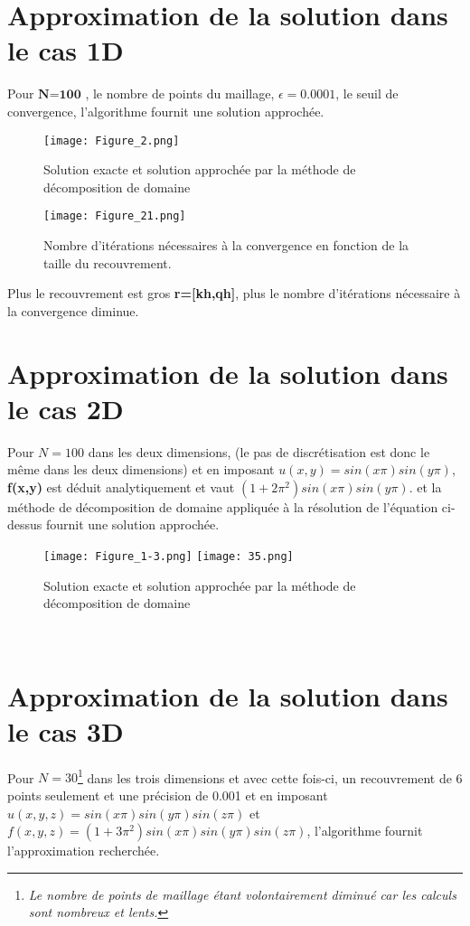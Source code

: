 \documentclass[a4paper,12pt,twoside]{report}
\begin{document}
\section{Approximation de la solution dans le cas 1D}

Pour $\textbf{N=100}$ , le nombre de points du maillage,  \textbf{$\epsilon=0.0001$}, le seuil de convergence, l'algorithme fournit une solution approchée.
\begin{figure}[htpb!]
\centering
  \texttt{[image: Figure\_2.png]}
  \caption{Solution exacte et solution approchée par la méthode de décomposition de domaine}
  \label{fig:exemple}
\end{figure}


\begin{figure}[htpb!]
\centering
  \texttt{[image: Figure\_21.png]}  \caption{Nombre d'itérations nécessaires à la convergence en fonction de la taille du recouvrement.}
  \label{fig:exemple}
\end{figure}
Plus le recouvrement est gros \textbf{r=[kh,qh]}, plus le nombre d'itérations nécessaire à la convergence diminue.





\section{Approximation de la solution dans le cas 2D}
Pour \textbf{$N=100$} dans les deux dimensions, (le pas de discrétisation est donc le même dans les deux dimensions) et en imposant $u(x,y)=sin(x\pi)sin(y\pi)$, \textbf{f(x,y)} est déduit analytiquement et vaut $(1+2\pi^{2}
)sin(x\pi)sin(y\pi)$.
et la méthode de décomposition de domaine appliquée à la résolution de l'équation ci-dessus fournit une solution approchée.
\begin{figure}[htpb!]
  \texttt{[image: Figure\_1-3.png]} 
    \texttt{[image: 35.png]}
  \caption{Solution exacte et solution approchée par la méthode de décomposition de domaine}
  \label{fig:exemple}
\end{figure}\


\section{Approximation de la solution dans le cas 3D}
Pour \textbf{$N=30$}\footnote{\textit{Le nombre de points de maillage étant volontairement diminué car les calculs sont nombreux et lents.}} dans les trois dimensions et avec cette fois-ci, un recouvrement de 6 points seulement et une précision de 0.001  et en imposant $u(x,y,z)=sin(x\pi)sin(y\pi)sin(z\pi)$ et $f(x,y,z)= (1+3\pi^{2}
)sin(x\pi)sin(y\pi)sin(z\pi)$, l'algorithme fournit l'approximation recherchée.
\end{document}
